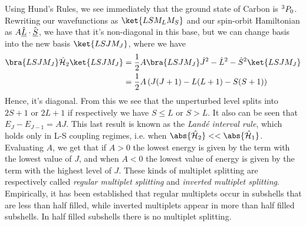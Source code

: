 \documentclass[../qm.tex]{subfiles}
\begin{document}
	Using Hund's Rules, we see immediately that the ground state of Carbon is $\term[0]{P}{3}$.\\
	Rewriting our wavefunctions as $\ket{LSM_LM_S}$ and our spin-orbit Hamiltonian as $A\vecopr{L}\cdot\vecopr{S}$, we have that it's non-diagonal in this base, but we can change basis into the new basis $\ket{LSJM_J}$, where we have
	\begin{equation}
		\begin{aligned}
			\bra{LSJM_J}\opr{\ham}_2\ket{LSJM_J}&=\frac{1}{2}A\bra{LSJM_J}\opr{J}^2-\opr{L}^2-\opr{S}^2\ket{LSJM_J}\\
			&=\frac{1}{2}A\left( J(J+1)-L(L+1)-S(S+1) \right)
		\end{aligned}
		\label{eq:neweigenvaluesham2so}
	\end{equation}
	Hence, it's diagonal. From this we see that the unperturbed level splits into $2S+1$ or $2L+1$ if respectively we have $S\le L$ or $S>L$. It also can be seen that $E_{J}-E_{J-1}=AJ$. This last result is known as the \textit{Landé interval rule}, which holds only in L-S coupling regimes, i.e. when $\abs{\opr{\ham}_2}<<\abs{\opr{\ham}_1}$. Evaluating $A$, we get that if $A>0$ the lowest energy is given by the term with the lowest value of $J$, and when $A<0$ the lowest value of energy is given by the term with the highest level of $J$. These kinds of multiplet splitting are respectively called \textit{regular multiplet splitting} and \textit{inverted multiplet splitting}. Empirically, it has been established that regular multiplets occur in subshells that are less than half filled, while inverted multiplets appear in more than half filled subshells. In half filled subshells there is no multiplet splitting.
\end{document}
